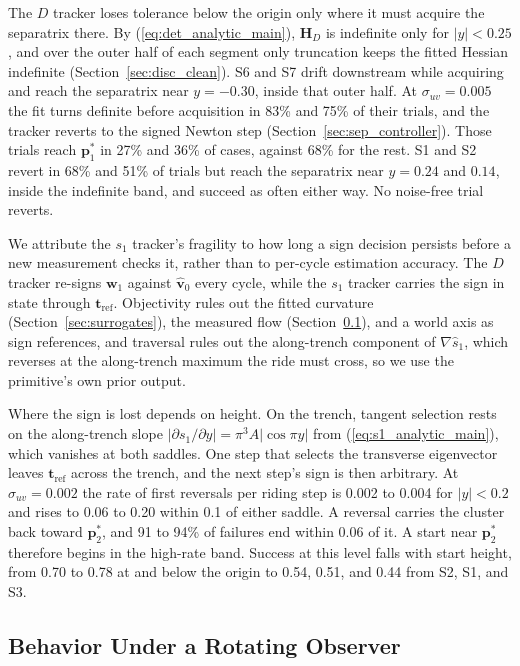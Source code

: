 \documentclass[lettersize,journal]{IEEEtran}
\begin{document}
The $D$ tracker loses tolerance below the origin only where it must acquire
the separatrix there. By (\ref{eq:det_analytic_main}), $\mathbf{H}_D$ is
indefinite only for $|y| < 0.25$, and over the outer half of each segment
only truncation keeps the fitted Hessian indefinite
(Section~\ref{sec:disc_clean}). S6 and S7 drift downstream while acquiring
and reach the separatrix near $y = -0.30$, inside that outer half. At
$\sigma_{uv} = 0.005$ the fit turns definite before acquisition in 83\% and
75\% of their trials, and the tracker reverts to the signed Newton step
(Section~\ref{sec:sep_controller}). Those trials reach $\mathbf{p}^*_1$ in
27\% and 36\% of cases, against 68\% for the rest. S1 and S2 revert in 68\%
and 51\% of trials but reach the separatrix near $y = 0.24$ and $0.14$,
inside the indefinite band, and succeed as often either way. No noise-free
trial reverts.

We attribute the $s_1$ tracker's fragility to how long a sign decision
persists before a new measurement checks it, rather than to per-cycle
estimation accuracy. The $D$ tracker re-signs $\mathbf{w}_1$ against
$\hat{\mathbf{v}}_0$ every cycle, while the $s_1$ tracker carries the sign in
state through $\mathbf{t}_{\mathrm{ref}}$. Objectivity rules out the fitted
curvature (Section~\ref{sec:surrogates}), the measured flow
(Section~\ref{sec:rotating}), and a world axis as sign references, and
traversal rules out the along-trench component of $\nabla\hat{s}_1$, which
reverses at the along-trench maximum the ride must cross, so we use the
primitive's own prior output.

Where the sign is lost depends on height. On the trench, tangent selection
rests on the along-trench slope $|\partial s_1/\partial y| = \pi^3 A|\cos\pi
y|$ from (\ref{eq:s1_analytic_main}), which vanishes at both saddles. One
step that selects the transverse eigenvector leaves $\mathbf{t}_{\mathrm{ref}}$
across the trench, and the next step's sign is then arbitrary. At
$\sigma_{uv} = 0.002$ the rate of first reversals per riding step is 0.002 to
0.004 for $|y| < 0.2$ and rises to 0.06 to 0.20 within 0.1 of either saddle.
A reversal carries the cluster back toward $\mathbf{p}^*_2$, and 91 to 94\% of
failures end within 0.06 of it. A start near $\mathbf{p}^*_2$ therefore begins
in the high-rate band. Success at this level falls with start height, from
0.70 to 0.78 at and below the origin to 0.54, 0.51, and 0.44 from S2, S1, and
S3.

\subsection{Behavior Under a Rotating Observer}
\label{sec:rotating}
\end{document}
